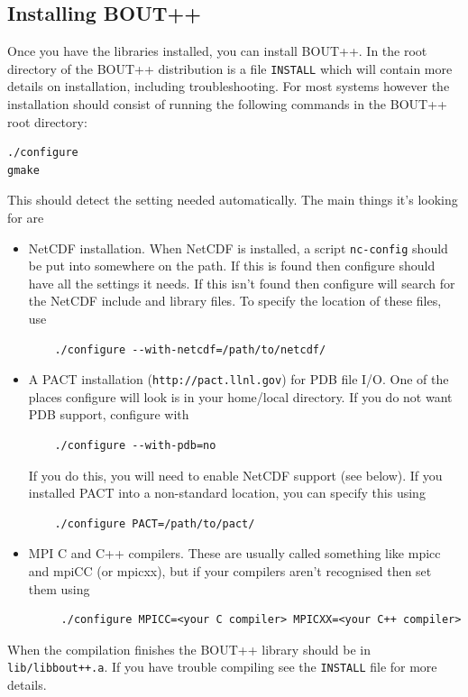 \documentclass[12pt]{article}
\begin{document}
\subsection{Installing BOUT++}
\label{sec:installbout}

Once you have the libraries installed, you can install BOUT++.
In the root directory of the BOUT++ distribution is a file \texttt{INSTALL} 
which will contain more details on installation, including troubleshooting.
For most systems however the installation should consist of running the
following commands in the BOUT++ root directory:
\begin{verbatim}
./configure
gmake
\end{verbatim}
This should detect the setting needed automatically. The main things it's
looking for are
\begin{itemize}
\item NetCDF installation. When NetCDF is installed, a script \texttt{nc-config}
should be put into somewhere on the path. If this is found then configure
should have all the settings it needs. If this isn't found then configure
will search for the NetCDF include and library files. To specify the location
of these files, use
\begin{verbatim}
    ./configure --with-netcdf=/path/to/netcdf/
\end{verbatim}
\item A PACT installation (\texttt{http://pact.llnl.gov}) for PDB file I/O. One of the places configure
  will look is in your home/local directory. If you do not want PDB support, configure with
\begin{verbatim}
    ./configure --with-pdb=no
\end{verbatim}
If you do this, you will need to enable NetCDF support (see below).
If you installed PACT into a non-standard location, you can specify this using
\begin{verbatim}
    ./configure PACT=/path/to/pact/
\end{verbatim}
\item MPI C and C++ compilers. These are usually called something like mpicc and mpiCC (or mpicxx), but if your compilers aren't recognised then set them using
\begin{verbatim}
     ./configure MPICC=<your C compiler> MPICXX=<your C++ compiler>
\end{verbatim}
\end{itemize}

When the compilation finishes the BOUT++ library should be in \texttt{lib/libbout++.a}.
If you have trouble compiling see the \texttt{INSTALL} file for more details.
\end{document}
